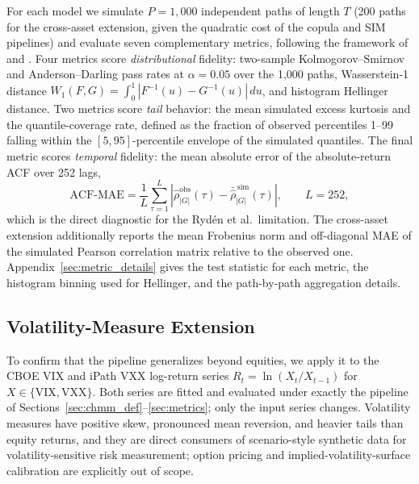For each model we simulate $P = 1{,}000$ independent paths of length $T$ (200 paths for the cross-asset extension, given the quadratic cost of the copula and SIM pipelines) and evaluate seven complementary metrics, following the framework of \cite{stenger2024thinking} and \cite{alswaidan2026hybrid}.
Four metrics score \emph{distributional} fidelity: two-sample Kolmogorov--Smirnov \cite{kolmogorov1933, smirnov1948} and Anderson--Darling pass rates at $\alpha = 0.05$ over the 1{,}000 paths, Wasserstein-1 distance $W_1(F, G) = \int_0^1 |F^{-1}(u) - G^{-1}(u)|\, du$, and histogram Hellinger distance.
Two metrics score \emph{tail} behavior: the mean simulated excess kurtosis and the quantile-coverage rate, defined as the fraction of observed percentiles 1--99 falling within the $[5, 95]$-percentile envelope of the simulated quantiles.
The final metric scores \emph{temporal} fidelity: the mean absolute error of the absolute-return ACF over 252 lags,
\begin{equation}
    \text{ACF-MAE} = \frac{1}{L}\sum_{\tau=1}^{L} \left| \hat\rho^{\text{obs}}_{|G|}(\tau) - \bar{\hat\rho}^{\,\text{sim}}_{|G|}(\tau) \right|,
    \qquad L = 252,
    \label{eq:acf_mae}
\end{equation}
which is the direct diagnostic for the Ryd\'{e}n et al.\ limitation.
The cross-asset extension additionally reports the mean Frobenius norm and off-diagonal MAE of the simulated Pearson correlation matrix relative to the observed one.
Appendix~\ref{sec:metric_details} gives the test statistic for each metric, the histogram binning used for Hellinger, and the path-by-path aggregation details.

\subsection{Volatility-Measure Extension}
\label{sec:vix_methods}

To confirm that the pipeline generalizes beyond equities, we apply it to the CBOE VIX and iPath VXX log-return series
$R_t = \ln(X_t / X_{t-1})$ for $X \in \{\text{VIX}, \text{VXX}\}$.
Both series are fitted and evaluated under exactly the pipeline of Sections~\ref{sec:chmm_def}--\ref{sec:metrics}; only the input series changes.
Volatility measures have positive skew, pronounced mean reversion, and heavier tails than equity returns, and they are direct consumers of scenario-style synthetic data for volatility-sensitive risk measurement; option pricing and implied-volatility-surface calibration are explicitly out of scope.
